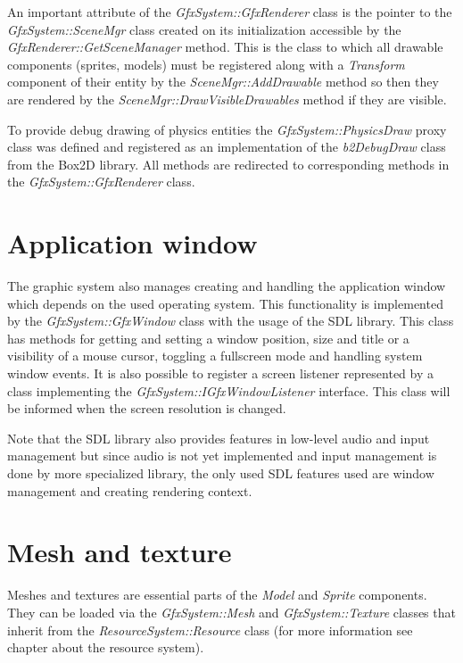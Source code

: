 \documentclass[a4paper, 12pt]{report}
\begin{document}
An important attribute of the \emph{GfxSystem::GfxRenderer} class is the point\-er to the \emph{GfxSystem::SceneMgr} class created on its initialization accessible by the \emph{GfxRenderer::GetSceneManager} method. This is the class to which all drawable components (sprites, models) must be registered along with a \emph{Transform} component of their entity by the \emph{SceneMgr::AddDrawable} method so then they are rendered by the \emph{SceneMgr::DrawVisibleDrawables} method if they are visible.

To provide debug drawing of physics entities the \emph{GfxSystem::PhysicsDraw} proxy class was defined and registered as an implementation of the \emph{b2\-Debug\-Draw} class from the Box2D library. All methods are redirected to corresponding methods in the \emph{GfxSystem::GfxRenderer} class.

\section{Application window}

The graphic system also manages creating and handling the application window which depends on the used operating system. This functionality is implemented by the \emph{GfxSystem::GfxWindow} class with the usage of the SDL library. This class has methods for getting and setting a window position, size and title or a visibility of a mouse cursor, toggling a fullscreen mode and handling system window events. It is also possible to register a screen listener represented by a class implementing the \emph{GfxSystem::IGfxWindowListener} interface. This class will be informed when the screen resolution is changed.

Note that the SDL library also provides features in low-level audio and input management but since audio is not yet implemented and input management is done by more specialized library, the only used SDL features used are window management and creating rendering context.

\section{Mesh and texture}

Meshes and textures are essential parts of the \emph{Model} and \emph{Sprite} components. They can be loaded via the \emph{GfxSystem::Mesh} and \emph{GfxSystem::Texture} classes that inherit from the \emph{ResourceSystem::Resource} class (for more information see chapter about the resource system).
\end{document}
